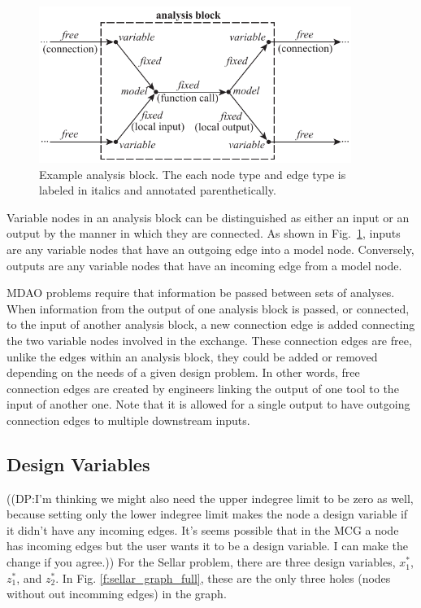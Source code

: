 \begin{figure}[htb!]
    \begin{center}
    \includegraphics[width=4in]{images/analysis_block}
    \end{center}
    \vspace{-10pt}
\caption{Example analysis block. The each node type and edge type is labeled in italics and annotated parenthetically.}
\label{f:analysis block}
\end{figure}

Variable nodes in an analysis block can be distinguished as either an input or 
an output by the manner in which they are connected. As shown in Fig.~\ref{f:analysis block}, 
inputs are any variable nodes that have an outgoing edge into a model 
node. Conversely, outputs are any variable nodes that have an incoming edge from a model node. 

MDAO problems require that information be passed between sets of analyses. When 
information from the output of one analysis block is passed, or connected, to the 
input of another analysis block, a new connection edge is added connecting the two 
variable nodes involved in the exchange. These connection edges are free, unlike the edges 
within an analysis block, they could be added or removed depending on the needs
of a given design problem. In other words, free connection edges are created by 
engineers linking the output of one tool to the input of another one. Note that 
it is allowed for a single output to have outgoing connection edges to multiple 
downstream inputs. 

\subsection{Design Variables}
((DP:I'm thinking we might also need the upper indegree limit to be zero as well, because setting only the lower indegree limit makes the node a design variable if it didn't have any incoming edges. It's seems possible that in the MCG a node has incoming edges but the user wants it to be a design variable. I can make the change if you agree.))
For the Sellar problem, there are three design variables, $x_1^*$, $z_1^*$, and $z_2^*$. In Fig. 
\ref{f:sellar_graph_full}, these are the only three holes (nodes without out 
incomming edges) in the graph. 

